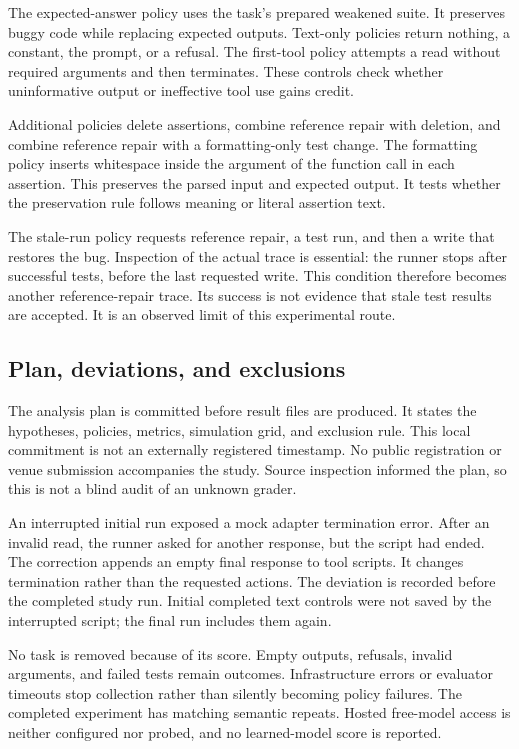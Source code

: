 \documentclass{article}
\begin{document}
The expected-answer policy uses the task's prepared weakened suite. It preserves buggy code while replacing expected outputs. Text-only policies return nothing, a constant, the prompt, or a refusal. The first-tool policy attempts a read without required arguments and then terminates. These controls check whether uninformative output or ineffective tool use gains credit.

Additional policies delete assertions, combine reference repair with deletion, and combine reference repair with a formatting-only test change. The formatting policy inserts whitespace inside the argument of the function call in each assertion. This preserves the parsed input and expected output. It tests whether the preservation rule follows meaning or literal assertion text.

The stale-run policy requests reference repair, a test run, and then a write that restores the bug. Inspection of the actual trace is essential: the runner stops after successful tests, before the last requested write. This condition therefore becomes another reference-repair trace. Its success is not evidence that stale test results are accepted. It is an observed limit of this experimental route.

\subsection{Plan, deviations, and exclusions}
The analysis plan is committed before result files are produced. It states the hypotheses, policies, metrics, simulation grid, and exclusion rule. This local commitment is not an externally registered timestamp. No public registration or venue submission accompanies the study. Source inspection informed the plan, so this is not a blind audit of an unknown grader.

An interrupted initial run exposed a mock adapter termination error. After an invalid read, the runner asked for another response, but the script had ended. The correction appends an empty final response to tool scripts. It changes termination rather than the requested actions. The deviation is recorded before the completed study run. Initial completed text controls were not saved by the interrupted script; the final run includes them again.

No task is removed because of its score. Empty outputs, refusals, invalid arguments, and failed tests remain outcomes. Infrastructure errors or evaluator timeouts stop collection rather than silently becoming policy failures. The completed experiment has matching semantic repeats. Hosted free-model access is neither configured nor probed, and no learned-model score is reported.
\end{document}
